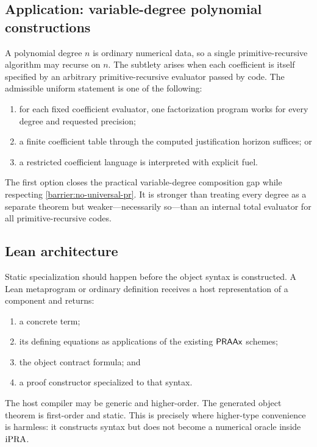 \subsection{Application: variable-degree polynomial constructions}

A polynomial degree \(n\) is ordinary numerical data, so a single primitive-recursive
algorithm may recurse on \(n\).  The subtlety arises when each coefficient is itself
specified by an arbitrary primitive-recursive evaluator passed by code.  The admissible
uniform statement is one of the following:

\begin{enumerate}[label=(\roman*),leftmargin=2.4em]
\item for each fixed coefficient evaluator, one factorization program works for every
degree and requested precision;
\item a finite coefficient table through the computed justification horizon suffices;
or
\item a restricted coefficient language is interpreted with explicit fuel.
\end{enumerate}

The first option closes the practical variable-degree composition gap while respecting
\cref{barrier:no-universal-pr}.  It is stronger than treating every degree as a
separate theorem but weaker---necessarily so---than an internal total evaluator for
all primitive-recursive codes.

\subsection{Lean architecture}

Static specialization should happen before the object syntax is constructed.  A Lean
metaprogram or ordinary definition receives a host representation of a component and
returns:

\begin{enumerate}[label=(\arabic*),leftmargin=2.4em]
\item a concrete  term;
\item its defining equations as applications of the existing \(\mathsf{PRAAx}\) schemes;
\item the object contract formula; and
\item a proof constructor specialized to that syntax.
\end{enumerate}

The host compiler may be generic and higher-order.  The generated object theorem is
first-order and static.  This is precisely where higher-type convenience is harmless:
it constructs syntax but does not become a numerical oracle inside \(\mathrm{iPRA}\).
